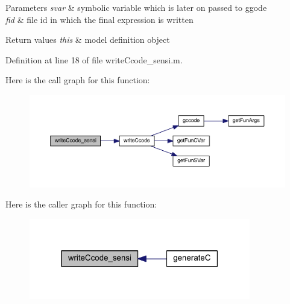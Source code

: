 \begin{DoxyParams}{Parameters}
{\em svar} & symbolic variable which is later on passed to ggode \\
\hline
{\em fid} & file id in which the final expression is written\\
\hline
\end{DoxyParams}

\begin{DoxyRetVals}{Return values}
{\em this} & model definition object \\
\hline
\end{DoxyRetVals}


Definition at line 18 of file write\+Ccode\+\_\+sensi.\+m.



Here is the call graph for this function\+:\nopagebreak
\begin{figure}[H]
\begin{center}
\leavevmode
\includegraphics[width=350pt]{classamimodel_a65b30e6d951ff694d40d45b0625742c7_cgraph}
\end{center}
\end{figure}




Here is the caller graph for this function\+:\nopagebreak
\begin{figure}[H]
\begin{center}
\leavevmode
\includegraphics[width=274pt]{classamimodel_a65b30e6d951ff694d40d45b0625742c7_icgraph}
\end{center}
\end{figure}


\hypertarget{classamimodel_a874862825ea3346f977f518072dec051}{}
